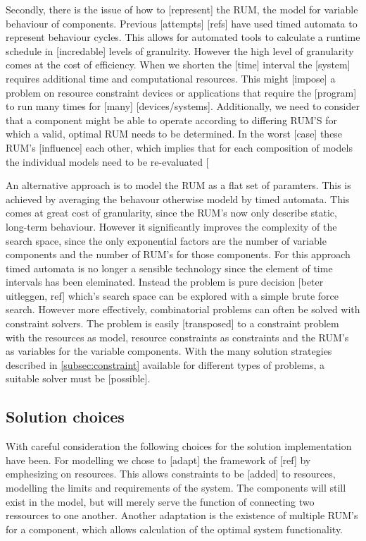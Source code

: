 Secondly, there is the issue of how to [represent] the RUM, the model for variable behaviour of components. Previous [attempts] [refs] have used timed automata to represent behaviour cycles. This allows for automated tools to calculate a runtime schedule in [incredable] levels of granulrity. However the high level of granularity comes at the cost of efficiency. When we shorten the [time] interval the [system] requires additional time and computational resources. This might [impose] a problem on resource constraint devices or applications that require the [program] to run many times for [many] [devices/systems]. Additionally, we need to consider that a component might be able to operate according to differing RUM'S for which a valid, optimal RUM needs to be determined. In the worst [case] these RUM's [influence] each other, which implies that for each composition of models the individual models need to be re-evaluated [%

An alternative approach is to model the RUM as a flat set of paramters. This is achieved by averaging the behavour otherwise modeld by timed automata. This comes at great cost of granularity, since the RUM's now only describe static, long-term behaviour. However it significantly improves the complexity of the search space, since the only exponential factors are the number of variable components and the number of RUM's for those components. For this approach timed automata is no longer a sensible technology since the element of time intervals has been eleminated. Instead the problem is pure decision [beter uitleggen, ref] which's search space can be explored with a simple brute force search. However more effectively, combinatorial problems can often be solved with constraint solvers. The problem is easily [transposed] to a constraint problem with the resources as model, resource constraints as constraints and the RUM's as variables for the variable components. With the many solution strategies described in \ref{subsec:constraint} available for different types of problems, a suitable solver must be [possible].

\subsection{Solution choices}
With careful consideration the following choices for the solution implementation have been. For modelling we chose to [adapt] the framework of [ref] by emphesizing on resources. This allows constraints to be [added] to resources, modelling the limits and requirements of the system. The components will still exist in the model, but will merely serve the function of connecting two ressources to one another. Another adaptation is the existence of multiple RUM's for a component, which allows calculation of the optimal system functionality.

